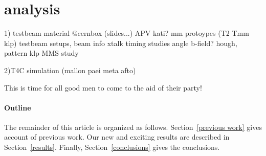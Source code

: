 
\section{analysis}

1) testbeam material @cernbox (slides...)
APV kati?
mm protoypes (T2 Tmm klp) testbeam setups, beam info
xtalk
timing studies
angle
b-field?
hough, pattern klp
MMS study

2)T4C simulation (mallon paei meta afto)

This is time for all good men to come to the aid of their party!

\paragraph{Outline}
The remainder of this article is organized as follows.
Section~\ref{previous work} gives account of previous work.
Our new and exciting results are described in Section~\ref{results}.
Finally, Section~\ref{conclusions} gives the conclusions.
